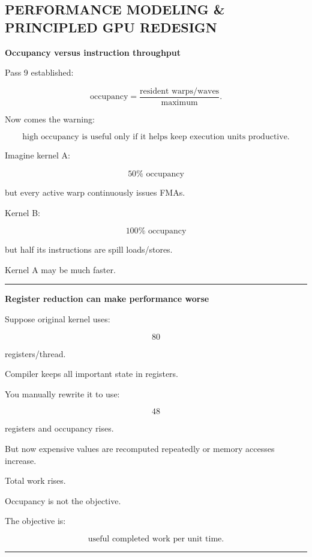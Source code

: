 \subsection{PERFORMANCE MODELING \& PRINCIPLED GPU REDESIGN}\label{01-foundations-i-ch012-performance-modeling-principled-gpu-redesign}

\hypertarget{01-foundations-i-ch012-performance-modeling-principled-gpu-redesign}{}

\textbf{Occupancy versus instruction throughput}

Pass 9 established:

\[
\text{occupancy}
=
\frac{
\text{resident warps/waves}
}{
\text{maximum}
}.
\]

Now comes the warning:

\[
\boxed{
\text{high occupancy is useful only if it helps keep execution units productive}.
}
\]

Imagine kernel A:

\[
50\%\text{ occupancy}
\]

but every active warp continuously issues FMAs.

Kernel B:

\[
100\%\text{ occupancy}
\]

but half its instructions are spill loads/stores.

Kernel A may be much faster.

\begin{center}\rule{0.5\linewidth}{0.5pt}\end{center}

\textbf{Register reduction can make performance worse}

Suppose original kernel uses:

\[
80
\]

registers/thread.

Compiler keeps all important state in registers.

You manually rewrite it to use:

\[
48
\]

registers and occupancy rises.

But now expensive values are recomputed repeatedly or memory accesses increase.

Total work rises.

Occupancy is not the objective.

The objective is:

\[
\boxed{
\text{useful completed work per unit time}.
}
\]

\begin{center}\rule{0.5\linewidth}{0.5pt}\end{center}

